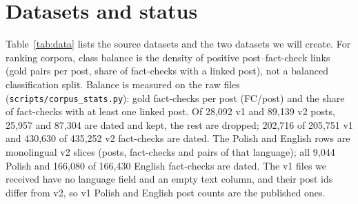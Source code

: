 \documentclass[11pt]{article}
\begin{document}
\section{Datasets and status}
\label{sec:data}
Table~\ref{tab:data} lists the source datasets and the two datasets we will create.
For ranking corpora, class balance is the density of positive post--fact-check links (gold pairs per post, share of fact-checks with a linked post), not a balanced classification split.
Balance is measured on the raw files (\texttt{scripts/corpus\_stats.py}): gold fact-checks per post (FC/post) and the share of fact-checks with at least one linked post.
Of 28,092 v1 and 89,139 v2 posts, 25,957 and 87,304 are dated and kept, the rest are dropped; 202,716 of 205,751 v1 and 430,630 of 435,252 v2 fact-checks are dated.
The Polish and English rows are monolingual v2 slices (posts, fact-checks and pairs of that language); all 9,044 Polish and 166,080 of 166,430 English fact-checks are dated.
The v1 files we received have no language field and an empty text column, and their post ids differ from v2, so v1 Polish and English post counts are the published ones.
\end{document}
